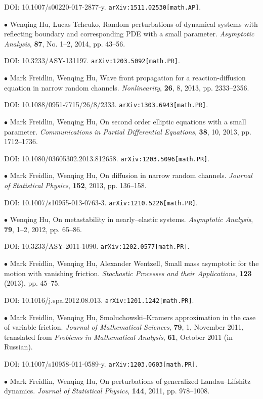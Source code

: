 \documentclass[margin,line]{res}
\begin{document}
\begin{resume}
DOI: 10.1007/s00220-017-2877-y. \verb"arXiv:1511.02530[math.AP]".


$\bullet$ Wenqing Hu, Lucas Tcheuko, Random perturbations of
dynamical systems with reflecting boundary and corresponding PDE
with a small parameter. \textit{Asymptotic Analysis}, \textbf{87},
No. 1--2, 2014, pp. 43--56. 

DOI: 10.3233/ASY-131197. \verb"arXiv:1203.5092[math.PR]".


$\bullet$ Mark Freidlin, Wenqing Hu, Wave front propagation for a
reaction-diffusion equation in narrow random channels.
\textit{Nonlinearity}, \textbf{26}, 8, 2013, pp. 2333--2356. 

DOI: 10.1088/0951-7715/26/8/2333. \verb"arXiv:1303.6943[math.PR]".


$\bullet$ Mark Freidlin, Wenqing Hu, On second order elliptic
equations with a small parameter. \textit{Communications in Partial
Differential Equations}, \textbf{38}, 10, 2013, pp. 1712--1736.

DOI: 10.1080/03605302.2013.812658. \verb"arXiv:1203.5096[math.PR]".


$\bullet$ Mark Freidlin, Wenqing Hu, On diffusion in narrow random
channels. \textit{Journal of Statistical Physics}, \textbf{152},
2013, pp. 136--158.

DOI: 10.1007/s10955-013-0763-3. \verb"arXiv:1210.5226[math.PR]".


$\bullet$ Wenqing Hu, On metastability in nearly--elastic systems.
\textit{Asymptotic Analysis}, \textbf{79}, 1--2, 2012, pp. 65--86.

DOI: 10.3233/ASY-2011-1090. \verb"arXiv:1202.0577[math.PR]".


$\bullet$ Mark Freidlin, Wenqing Hu, Alexander Wentzell, Small mass
asymptotic for the motion with vanishing friction.
\textit{Stochastic Processes and their Applications}, \textbf{123}
(2013), pp. 45--75.

DOI: 10.1016/j.spa.2012.08.013. \verb"arXiv:1201.1242[math.PR]".


$\bullet$ Mark Freidlin, Wenqing Hu, Smoluchowski--Kramers
approximation in the case of variable friction. \textit{Journal of
Mathematical Sciences}, \textbf{79}, 1, November 2011, translated
from \textit{Problems in Mathematical Analysis}, \textbf{61},
October 2011 (in Russian).

DOI: 10.1007/s10958-011-0589-y. \verb"arXiv:1203.0603[math.PR]".


$\bullet$ Mark Freidlin, Wenqing Hu, On perturbations of generalized
Landau--Lifshitz dynamics. \textit{Journal of Statistical Physics},
\textbf{144}, 2011, pp. 978--1008.


\end{resume}
\end{document}
